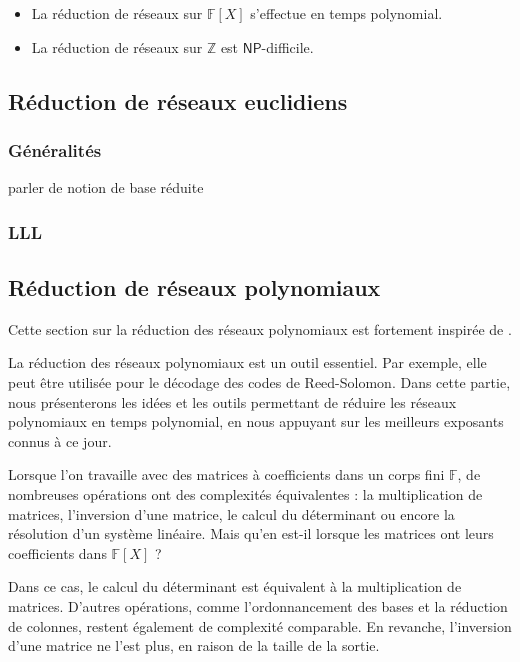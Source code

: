 \documentclass[a4paper,12pt]{report}  %
\theoremstyle{definitionstyle}
\theoremstyle{examplestyle}
\theoremstyle{remarkstyle}
\theoremstyle{propositionstyle}
\theoremstyle{theoremstyle}
\begin{document}
	\begin{itemize}
		\item La réduction de réseaux sur $\mathbb{F}[X]$ s'effectue en temps polynomial.
		\item La réduction de réseaux sur $\mathbb{Z}$ est $\mathsf{NP}$-difficile.
	\end{itemize}	
	
	\subsection{Réduction de réseaux euclidiens}
	
	\subsubsection{Généralités}
	
	parler de notion de base réduite
	\subsubsection{LLL}
	
	\subsection{Réduction de réseaux polynomiaux}
	Cette section sur la réduction des réseaux polynomiaux est fortement inspirée de \cite{CCLebreton}.  
	
	La réduction des réseaux polynomiaux est un outil essentiel. Par exemple, elle peut être utilisée pour le décodage des codes de Reed-Solomon. Dans cette partie, nous présenterons les idées et les outils permettant de réduire les réseaux polynomiaux en temps polynomial, en nous appuyant sur les meilleurs exposants connus à ce jour.  
	
	Lorsque l'on travaille avec des matrices à coefficients dans un corps fini \(\mathbb{F}\), de nombreuses opérations ont des complexités équivalentes : la multiplication de matrices, l'inversion d'une matrice, le calcul du déterminant ou encore la résolution d'un système linéaire. Mais qu'en est-il lorsque les matrices ont leurs coefficients dans \(\mathbb{F}[X]\) ?  
	
	Dans ce cas, le calcul du déterminant est équivalent à la multiplication de matrices. D'autres opérations, comme l'ordonnancement des bases et la réduction de colonnes, restent également de complexité comparable. En revanche, l'inversion d'une matrice ne l'est plus, en raison de la taille de la sortie.
	
\end{document}
